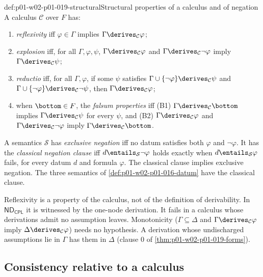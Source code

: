 \begin{hbdefinition}{def:p01-w02-p01-019-structural}{Structural properties of a calculus and of negation}
A calculus \(\mathcal C\) over \(F\) has:
\begin{enumerate}
  \item \emph{reflexivity} iff \(\varphi\in\Gamma\) implies
        \(\Gamma\derives_{\mathcal C}\varphi\);
  \item \emph{explosion} iff, for all \(\Gamma,\varphi,\psi\),
        \(\Gamma\derives_{\mathcal C}\varphi\) and
        \(\Gamma\derives_{\mathcal C}\neg\varphi\) imply
        \(\Gamma\derives_{\mathcal C}\psi\);
  \item \emph{reductio} iff, for all \(\Gamma,\varphi\), if some \(\psi\)
        satisfies \(\Gamma\cup\{\neg\varphi\}\derives_{\mathcal C}\psi\) and
        \(\Gamma\cup\{\neg\varphi\}\derives_{\mathcal C}\neg\psi\), then
        \(\Gamma\derives_{\mathcal C}\varphi\);
  \item when \(\bottom\in F\), the \emph{falsum properties} iff
        (B1) \(\Gamma\derives_{\mathcal C}\bottom\) implies
        \(\Gamma\derives_{\mathcal C}\psi\) for every \(\psi\), and
        (B2) \(\Gamma\derives_{\mathcal C}\varphi\) and
        \(\Gamma\derives_{\mathcal C}\neg\varphi\) imply
        \(\Gamma\derives_{\mathcal C}\bottom\).
\end{enumerate}
A semantics \(\mathcal S\) has \emph{exclusive negation} iff no datum
satisfies both \(\varphi\) and \(\neg\varphi\). It has the \emph{classical
negation clause} iff \(d\entails_{\mathcal S}\neg\varphi\) holds exactly when
\(d\entails_{\mathcal S}\varphi\) fails, for every datum \(d\) and formula
\(\varphi\). The classical clause implies exclusive negation. The three
semantics of \cref{def:p01-w02-p01-016-datum} have the classical clause.
\end{hbdefinition}

Reflexivity is a property of the calculus, not of the definition of
derivability. In \(\mathsf{ND}_{\mathsf{CPL}}\) it is witnessed by the
one-node derivation. It fails in a calculus whose derivations admit no
assumption leaves. Monotonicity
(\(\Gamma\subseteq\Delta\) and \(\Gamma\derives_{\mathcal C}\varphi\) imply
\(\Delta\derives_{\mathcal C}\varphi\)) needs no hypothesis. A derivation
whose undischarged assumptions lie in \(\Gamma\) has them in \(\Delta\)
(clause 0 of \cref{thm:p01-w02-p01-019-forms}).

\subsection{Consistency relative to a calculus}
\label{sec:p01-w02-p01-019-forms}

